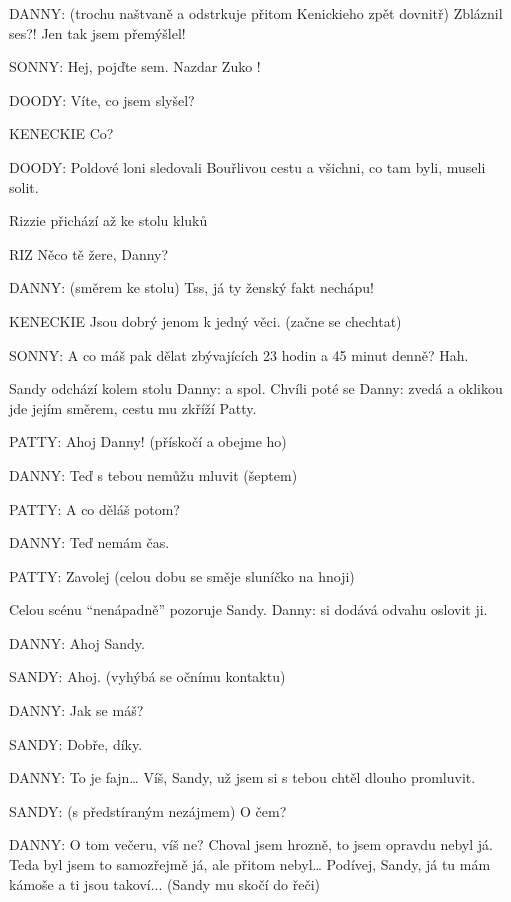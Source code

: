 \rep DANNY:         (trochu naštvaně a odstrkuje přitom Kenickieho zpět dovnitř) Zbláznil         ses?! Jen tak jsem přemýšlel! 

\rep SONNY:         Hej, pojďte sem. Nazdar Zuko !  

\rep DOODY:         Víte, co jsem slyšel? 

KENECKIE        Co? 

\rep DOODY:         Poldové loni sledovali Bouřlivou cestu a všichni, co tam byli, museli solit. 

Rizzie přichází až ke stolu kluků 

RIZ         Něco tě žere, Danny? 

\rep DANNY:        (směrem ke stolu) Tss, já ty ženský fakt nechápu! 

KENECKIE        Jsou dobrý jenom k jedný věci. (začne se chechtat) 

\rep SONNY:         A co máš pak dělat zbývajících 23 hodin a 45 minut denně? Hah. 

Sandy odchází kolem stolu \rep Danny: a spol. Chvíli poté se \rep Danny: zvedá a oklikou jde jejím směrem, cestu mu zkříží Patty. 

\rep PATTY:        Ahoj Danny! (přískočí a obejme ho) 

\rep DANNY:        Teď s tebou nemůžu mluvit (šeptem) 

\rep PATTY:         A co děláš potom? 

\rep DANNY:         Teď nemám čas.

\rep PATTY:         Zavolej (celou dobu se směje sluníčko na hnoji) 

Celou scénu “nenápadně” pozoruje Sandy. \rep Danny: si dodává odvahu oslovit ji. 

\rep DANNY:         Ahoj Sandy.

\rep SANDY:        Ahoj. (vyhýbá se očnímu kontaktu) 

\rep DANNY:        Jak se máš? 

\rep SANDY:        Dobře, díky. 

\rep DANNY:        To je fajn… Víš, Sandy, už jsem si s tebou chtěl dlouho promluvit. 

\rep SANDY:         (s předstíraným nezájmem) O čem? 

\rep DANNY:         O tom večeru, víš ne? Choval jsem hrozně, to jsem opravdu nebyl já.         Teda byl jsem to samozřejmě já, ale přitom nebyl… Podívej, Sandy, já tu         mám kámoše a ti jsou takoví... (Sandy mu skočí do řeči) 

